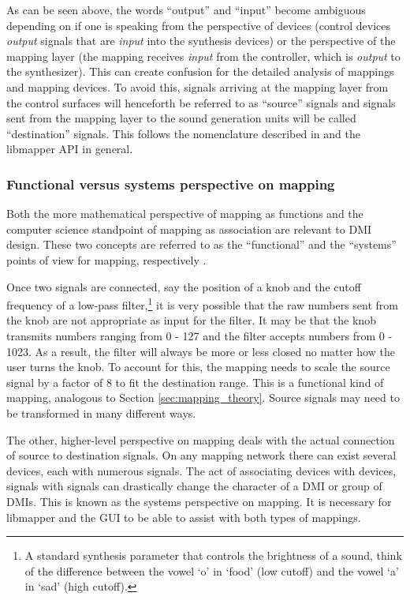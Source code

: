 As can be seen above, the words ``output'' and ``input'' become ambiguous depending on if one is speaking from the perspective of devices (control devices \emph{output} signals that are \emph{input} into the synthesis devices) or the perspective of the mapping layer (the mapping receives \emph{input} from the controller, which is \emph{output} to the synthesizer). This can create confusion for the detailed analysis of mappings and mapping devices. To avoid this, signals arriving at the mapping layer from the control surfaces will henceforth be referred to as ``source'' signals and signals sent from the mapping layer to the sound generation units will be called ``destination'' signals. This follows the nomenclature described in  and the libmapper API in general.

	\subsubsection{Functional versus systems perspective on mapping}

Both the more mathematical perspective of mapping as functions and the computer science standpoint of mapping as association are relevant to DMI design. These two concepts are referred to as the ``functional'' and the ``systems'' points of view for mapping, respectively \cite{two_types_of_mapping}. 

Once two signals are connected, say the position of a knob and the cutoff frequency of a low-pass filter,\footnote{A standard synthesis parameter that controls the brightness of a sound, think of the difference between the vowel `o' in `food' (low cutoff) and the vowel `a' in `sad' (high cutoff).} it is very possible that the raw numbers sent from the knob are not appropriate as input for the filter. It may be that the knob transmits numbers ranging from 0 - 127 and the filter accepts numbers from 0 - 1023. As a result, the filter will always be more or less closed no matter how the user turns the knob. To account for this, the mapping needs to scale the source signal by a factor of 8 to fit the destination range. This is a functional kind of mapping, analogous to Section \ref{sec:mapping_theory}. Source signals may need to be transformed in many different ways. 

The other, higher-level perspective on mapping deals with the actual connection of source to destination signals. On any mapping network there can exist several devices, each with numerous signals. The act of associating devices with devices, signals with signals can drastically change the character of a DMI or group of DMIs. This is known as the systems perspective on mapping. It is necessary for libmapper and the GUI to be able to assist with both types of mappings.

